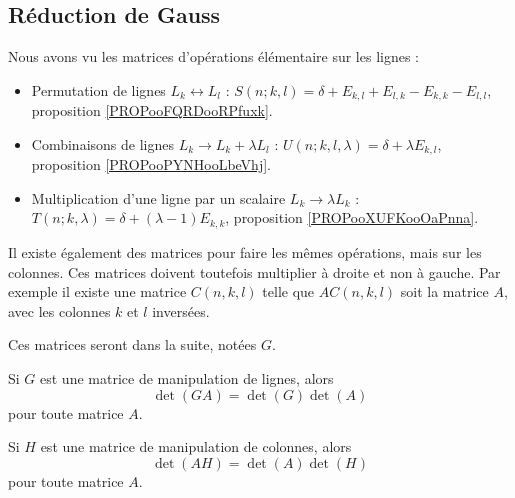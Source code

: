 \subsection{Réduction de Gauss}

\begin{normaltext}		\label{NORMooDXYZooEdnztA}
	Nous avons vu les matrices d'opérations élémentaire sur les lignes :
	\begin{itemize}
		\item Permutation de lignes \( L_k\leftrightarrow L_l\)  : \( S(n;k,l)=\delta+E_{k,l}+E_{l,k}-E_{k,k}-E_{l,l}\), proposition \ref{PROPooFQRDooRPfuxk}.
		\item Combinaisons de lignes \( L_k\to L_k+\lambda L_l\) : \( U(n;k,l,\lambda)=\delta+\lambda E_{k,l}\), proposition \ref{PROPooPYNHooLbeVhj}.
		\item Multiplication d'une ligne par un scalaire \( L_k\to \lambda L_k\) : \( T(n;k,\lambda)=\delta+(\lambda-1)E_{k,k}\), proposition \ref{PROPooXUFKooOaPnna}.
	\end{itemize}

	Il existe également des matrices pour faire les mêmes opérations, mais sur les colonnes. Ces matrices doivent toutefois multiplier à droite et non à gauche. Par exemple il existe une matrice \( C(n,k,l)\) telle que \( AC(n,k,l)\) soit la matrice \( A\), avec les colonnes \( k\) et \( l\) inversées.

\end{normaltext}

Ces matrices seront dans la suite, notées \( G\).

\begin{lemma}		\label{LEMooDXSZooVpbCRj}
	Si \( G\) est une matrice de manipulation de lignes, alors
	\begin{equation}        \label{EQooLQTVooBYjVYl}
		\det(GA)=\det(G)\det(A)
	\end{equation}
	pour toute matrice \( A\).

	Si \( H\) est une matrice de manipulation de colonnes, alors
	\begin{equation}
		\det(AH)=\det(A)\det(H)
	\end{equation}
	pour toute matrice \( A\).
\end{lemma}

